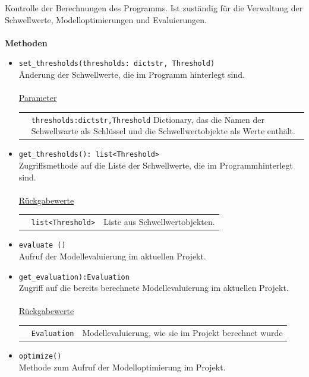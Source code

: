 \documentclass{article}
\begin{document}
\begin{itemize}
Kontrolle der Berechnungen des Programms. Ist zuständig für die Verwaltung der Schwellwerte, Modelloptimierungen und Evaluierungen.\\\\
\textbf{\large{Methoden}}
\begin{itemize}
\item \texttt{set\_thresholds(thresholds: dict{str, Threshold})}\\ Änderung der Schwellwerte, die im Programm hinterlegt sind.\\\\
\underline{{Parameter}}\\
\begin{tabular}{lp{10.7cm}}
 & \texttt{thresholds:dict{str,Threshold}} Dictionary, das die Namen der Schwellwarte als Schlüssel und die Schwellwertobjekte als Werte enthält. \\
\end{tabular}
\item \texttt{get\_thresholds(): list<Threshold>}\\ Zugriffsmethode auf die Liste der Schwellwerte, die im Programmhinterlegt sind.\\\\
\underline{{Rückgabewerte}}\\
\begin{tabular}{lll}
 & \texttt{list<Threshold>} & Liste aus Schwellwertobjekten. \\
\end{tabular}
\item \texttt{evaluate ()}\\ Aufruf der Modellevaluierung im aktuellen Projekt.
\item \texttt{get\_evaluation):Evaluation}\\ Zugriff auf die bereits berechnete Modellevaluierung im aktuellen Projekt.\\\\
\underline{{Rückgabewerte}}\\
\begin{tabular}{lll}
 & \texttt{Evaluation} & Modellevaluierung, wie sie im Projekt berechnet wurde \\
\end{tabular}
\item \texttt{optimize()}\\ Methode zum Aufruf der Modelloptimierung im Projekt.\\
\end{itemize}






\end{itemize}
\end{document}
